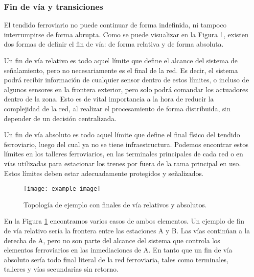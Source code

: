 \subsubsection{Fin de vía y transiciones}

El tendido ferroviario no puede continuar de forma indefinida, ni tampoco interrumpirse de forma abrupta. Como se puede visualizar en la Figura \ref{fig:frontera_1}, existen dos formas de definir el fin de vía: de forma relativa y de forma absoluta.

Un fin de vía relativo es todo aquel límite que define el alcance del sistema de señalamiento, pero no necesariamente es el final de la red. Es decir, el sistema podrá recibir información de cualquier sensor dentro de estos límites, o incluso de algunos sensores en la frontera exterior, pero solo podrá comandar los actuadores dentro de la zona. Esto es de vital importancia a la hora de reducir la complejidad de la red, al realizar el procesamiento de forma distribuida, sin depender de un decisión centralizada.

Un fin de vía absoluto es todo aquel límite que define el final físico del tendido ferroviario, luego del cual ya no se tiene infraestructura. Podemos encontrar estos límites en los talleres ferroviarios, en las terminales principales de cada red o en vías utilizadas para estacionar los trenes por fuera de la rama principal en uso. Estos límites deben estar adecuadamente protegidos y señalizados.

    \begin{figure}[!h]
        \centering
        \texttt{[image: example-image]}
        \centering\caption{Topología de ejemplo con finales de vía relativos y absolutos.}
        \label{fig:frontera_1}
    \end{figure}
    
En la Figura \ref{fig:frontera_1} encontramos varios casos de ambos elementos. Un ejemplo de fin de vía relativo sería la frontera entre las estaciones A y B. Las vías continúan a la derecha de A, pero no son parte del alcance del sistema que controla los elementos ferroviarios en las inmediaciones de A. En tanto que un fin de vía absoluto sería todo final literal de la red ferroviaria, tales como terminales, talleres y vías secundarias sin retorno.